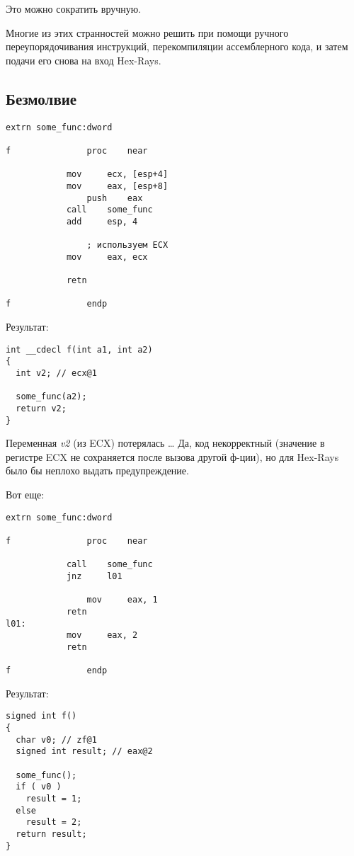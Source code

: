 Это можно сократить вручную.

Многие из этих странностей можно решить при помощи ручного переупорядочивания инструкций, перекомпиляции ассемблерного кода,
и затем подачи его снова на вход Hex-Rays.

\subsection{Безмолвие}

\begin{lstlisting}[style=customasmx86]
extrn some_func:dword

f               proc    near

        	mov     ecx, [esp+4]
	        mov     eax, [esp+8]
                push    eax
        	call    some_func
	        add     esp, 4

                ; используем ECX
        	mov     eax, ecx

	        retn

f               endp
\end{lstlisting}

Результат:

\begin{lstlisting}[style=customc]
int __cdecl f(int a1, int a2)
{
  int v2; // ecx@1

  some_func(a2);
  return v2;
}
\end{lstlisting}

Переменная \emph{v2} (из ECX) потерялась \dots
Да, код некорректный (значение в регистре ECX не сохраняется после вызова другой ф-ции),
но для Hex-Rays было бы неплохо выдать предупреждение.

Вот еще:

\begin{lstlisting}[style=customasmx86]
extrn some_func:dword

f               proc    near

	        call    some_func
        	jnz     l01

                mov     eax, 1
	        retn
l01:
	        mov     eax, 2
        	retn

f               endp
\end{lstlisting}

Результат:

\begin{lstlisting}[style=customc]
signed int f()
{
  char v0; // zf@1
  signed int result; // eax@2

  some_func();
  if ( v0 )
    result = 1;
  else
    result = 2;
  return result;
}
\end{lstlisting}

